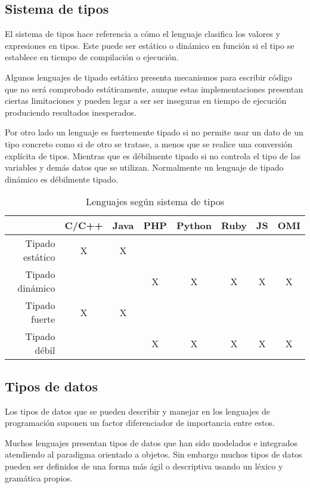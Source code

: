 \subsection{Sistema de tipos}
El sistema de tipos hace referencia a cómo el lenguaje clasifica los valores
y expresiones en tipos. Este puede ser estático o dinámico en función si el tipo 
se establece en tiempo de compilación o ejecución. 

Algunos lenguajes de tipado estático presenta mecanismos para escribir código 
que no será comprobado estáticamente, aunque estas implementaciones presentan 
ciertas limitaciones y pueden legar a ser ser inseguras en tiempo de ejecución produciendo resultados inesperados.
 
Por otro lado un lenguaje es fuertemente tipado si no permite usar un dato de un tipo concreto
como si de otro se tratase, a menos que se realice una conversión explícita de tipos. Mientras que es 
débilmente tipado si no controla el tipo de las variables y demás datos que se utilizan. Normalmente
un lenguaje de tipado dinámico es débilmente tipado.
 
 \FloatBarrier
\begin{table}[h]
 \begin{center}
\begin{tabular}{|r|c|c|c|c|c|c|c|} \hline
 & C/C++ & Java & PHP  & Python & Ruby & JS & OMI \\ \hline
Tipado estático & X & X &  &  &  &  &  \\ \hline
Tipado dinámico & & & X & X & X & X & X \\ \hline
Tipado fuerte & X & X &  &  &  &  &  \\ \hline
Tipado débil  & & & X & X & X & X & X \\ \hline
\end{tabular}
\caption{Lenguajes según sistema de tipos}
\end{center}
\end{table}
\FloatBarrier

\subsection{Tipos de datos}
Los tipos de datos que se pueden describir y manejar en los lenguajes de 
programación suponen un factor diferenciador de importancia entre estos.

Muchos lenguajes presentan tipos de datos que han sido modelados e integrados atendiendo
al paradigma orientado a objetos. Sin embargo muchos tipos de datos pueden ser definidos
de una forma más ágil o descriptiva usando un léxico y gramática propios.   

